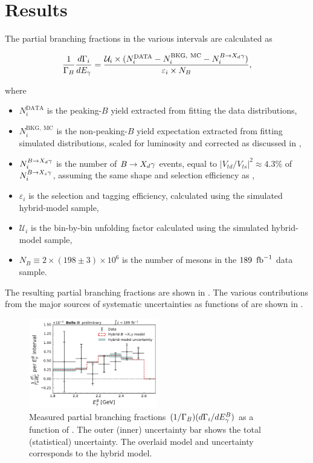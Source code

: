 \section{Results}\label{sec:results}

The partial branching fractions in the various \EB intervals are calculated as

\begin{equation}\label{eq:branching_fraction}
    \frac{1}{\Gamma_B}\frac{d\Gamma_i}{dE_{\gamma}} = \frac{\mathcal{U}_i\times(N^{\mathrm{DATA}}_i - N^{\mathrm{BKG,~MC}}_i-N_i^{B\rightarrow X_d \gamma})}{\varepsilon_i \times N_B},
\end{equation}

where

\begin{itemize}
    \item $N^{\mathrm{DATA}}_i$ is the peaking-$B$ yield extracted from fitting the data distributions,
    \item $N^{\mathrm{BKG,~MC}}_i$ is the non-\BtoXsgamma peaking-$B$ yield expectation extracted from fitting simulated distributions, scaled for luminosity and corrected as discussed in ,
    \item $N_i^{B\rightarrow X_d \gamma}$ is the number of $B\rightarrow X_d \gamma$ events, equal to $|{V_{td}}/{V_{ts}}|^2 \approx 4.3 \% $ \cite{Workman:2022ynf} of  $N_i^{B\rightarrow X_s \gamma}$, assuming the same shape and selection efficiency as \BtoXsgamma,
    \item $\varepsilon_i$ is the \BtoXsgamma selection and tagging efficiency, calculated using the simulated hybrid-model sample,
    \item $\mathcal{U}_i$ is the bin-by-bin unfolding factor calculated using the simulated hybrid-model sample,
    \item $N_B\equiv2\times(198 \pm 3)\times10^6$ is the number of \B mesons in the $189~\mbox{\,fb}^{-1}$ data sample.
\end{itemize}

The resulting partial branching fractions are shown in . The various contributions from the major sources of systematic uncertainties as functions of \EB are shown in .

\begin{figure}[htbp!]
    \centering
    \includegraphics[width=0.5\textwidth]{results/plots/final_partial_bfs_expectation.pdf}
    \caption{Measured partial branching fractions $ (1/\Gamma_B)(d\Gamma_i/dE^B_{\gamma})$ as a function of \EB. The outer (inner) uncertainty bar shows the total (statistical) uncertainty. The overlaid model and uncertainty corresponds to the hybrid model.}
    \label{fig:partial_bfs}
\end{figure}

